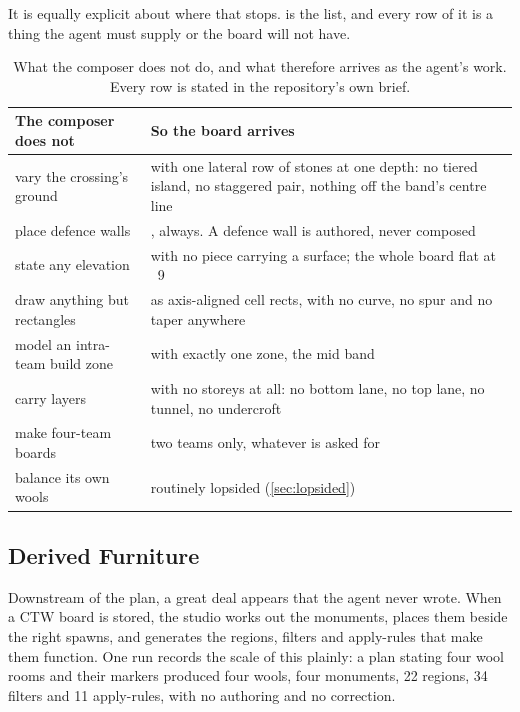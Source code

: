 It is equally explicit about where that stops.  is the
list, and every row of it is a thing the agent must supply or the board will not
have.

\begin{table}[htbp]
\caption{What the composer does not do, and what therefore arrives as the agent's
work. Every row is stated in the repository's own brief.}
\label{tab:composer-stops}
\small
\begin{tabularx}{\textwidth}{L{5.4cm} Y}
\toprule
\textbf{The composer does not} & \textbf{So the board arrives} \\
\midrule
vary the crossing's ground &
  with one lateral row of stones at one depth: no tiered island, no staggered
  pair, nothing off the band's centre line \\
place defence walls &
  , always. A defence wall is authored, never composed \\
state any elevation &
  with no piece carrying a surface; the whole board flat at
  ~9 \\
draw anything but rectangles &
  as axis-aligned cell rects, with no curve, no spur and no taper anywhere \\
model an intra-team build zone &
  with exactly one zone, the mid band \\
carry layers &
  with no storeys at all: no bottom lane, no top lane, no tunnel, no undercroft \\
make four-team boards &
  two teams only, whatever is asked for \\
balance its own wools &
  routinely lopsided (\cref{sec:lopsided}) \\
\bottomrule
\end{tabularx}
\end{table}

\subsection{Derived Furniture}

Downstream of the plan, a great deal appears that the agent never wrote. When a
CTW board is stored, the studio works out the monuments, places them beside the
right spawns, and generates the regions, filters and apply-rules that make them
function. One run records the scale of this plainly: a plan stating four wool
rooms and their markers produced four wools, four monuments, 22 regions, 34
filters and 11 apply-rules, with no authoring and no correction.

